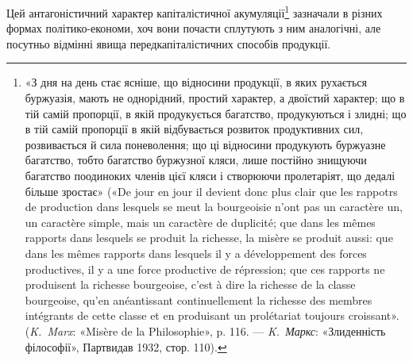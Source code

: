 Цей антагоністичний характер капіталістичної акумуляції\footnote{
«З дня на день стає ясніше, що відносини продукції, в яких
рухається буржуазія, мають не однорідний, простий характер, а двоїстий
характер; що в тій самій пропорції, в якій продукується багатство,
продукуються і злидні; що в тій самій пропорції в якій відбувається розвиток
продуктивних сил, розвивається й сила поневолення; що ці відносини
продукують буржуазне багатство, тобто багатство буржузної кляси, лише
постійно знищуючи багатство поодиноких членів цієї кляси і створюючи
пролетаріят, що дедалі більше зростає» («De jour en jour il devient donc
plus clair que les rappotrs de production dans lesquels se meut la bourgeoisie
n’ont pas un caractère un, un caractère simple, mais un caractère de duplicité;
que dans les mêmes rapports dans lesquels se produit la richesse, la
misère se produit aussi: que dans les mêmes rapports dans lesquels il y a
développement des forces productives, il y a une force productive de répression;
que ces rapports ne produisent la richesse bourgeoise, c’est à dire
la richesse de la classe bourgeoise, qu’en anéantissant continuellement la
richesse des membres intégrants de cette classe et en produisant un prolétariat
toujours croissant». (\emph{K.~Marx}: «Misère de la Philosophie», p. 116.
— \emph{K.~Маркс}: «Злиденність філософії», Партвидав 1932, стор. 110).
}
зазначали в різних формах політико-економи, хоч вони почасти
сплутують з ним аналогічні, але посутньо відмінні явища передкапіталістичних
способів продукції.

